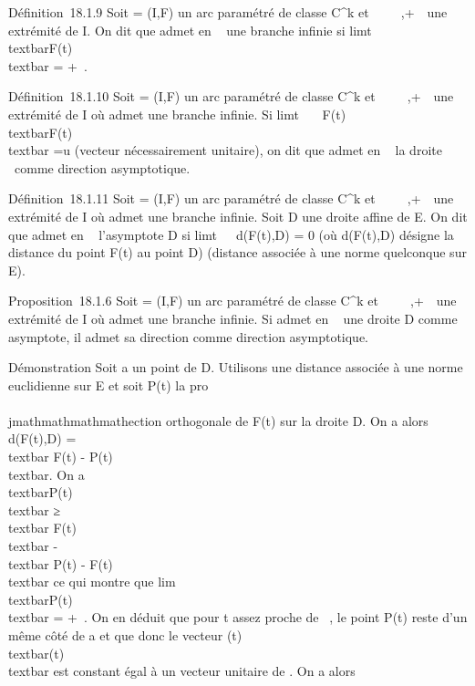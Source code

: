 Définition~18.1.9 Soit \Gamma = (I,F) un arc paramétré de classe
C^k et \alpha~ \in {}~ \cup\-\infty~,+\infty~\ une
extrémité de I. On dit que \Gamma admet en \alpha~ une branche infinie si
limt\rightarrow~\alpha~~\\textbar{}F(t)\\textbar{}
= +\infty~.

Définition~18.1.10 Soit \Gamma = (I,F) un arc paramétré de classe
C^k et \alpha~ \in {}~ \cup\-\infty~,+\infty~\ une
extrémité de I où \Gamma admet une branche infinie. Si
limt\rightarrow~\alpha~~ F(t) \over
\\textbar{}F(t)\\textbar{}
=\vec u (vecteur nécessairement unitaire), on dit que
\Gamma admet en \alpha~ la droite ~\vecu comme direction
asymptotique.

Définition~18.1.11 Soit \Gamma = (I,F) un arc paramétré de classe
C^k et \alpha~ \in {}~ \cup\-\infty~,+\infty~\ une
extrémité de I où \Gamma admet une branche infinie. Soit D une droite affine
de E. On dit que \Gamma admet en \alpha~ l'asymptote D si
limt\rightarrow~\alpha~~d(F(t),D) = 0 (où d(F(t),D)
désigne la distance du point F(t) au point D) (distance associée à une
norme quelconque sur E).

Proposition~18.1.6 Soit \Gamma = (I,F) un arc paramétré de classe
C^k et \alpha~ \in {}~ \cup\-\infty~,+\infty~\ une
extrémité de I où \Gamma admet une branche infinie. Si \Gamma admet en \alpha~ une
droite D comme asymptote, il admet sa direction \vecD
comme direction asymptotique.

Démonstration Soit a un point de D. Utilisons une distance associée à
une norme euclidienne sur E et soit P(t) la pro\\\\jmathmathmathmathection orthogonale de
F(t) sur la droite D. On a alors d(F(t),D) =\\textbar{}
F(t) - P(t)\\textbar{}. On a
\\textbar{}P(t)\\textbar{}
≥\\textbar{} F(t)\\textbar{}
-\\textbar{} P(t) - F(t)\\textbar{} ce qui
montre que
lim~\\textbar{}P(t)\\textbar{}
= +\infty~. On en déduit que pour t assez proche de \alpha~, le point P(t) reste
d'un même côté de a et que donc le vecteur 
\overrightarrowaP(t) \over
\\textbar{}\overrightarrowaP(t)\\textbar{}
est constant égal à un vecteur unitaire \vecu de
\vecD. On a alors

